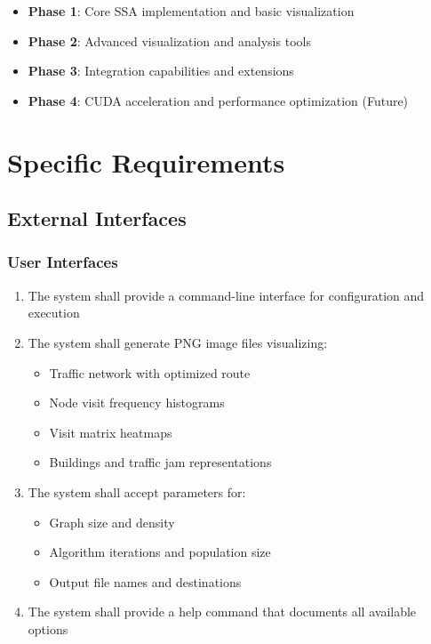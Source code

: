 \documentclass[conference]{IEEEtran}
\begin{document}
\begin{itemize}
    \item \textbf{Phase 1}: Core SSA implementation and basic visualization
    \item \textbf{Phase 2}: Advanced visualization and analysis tools
    \item \textbf{Phase 3}: Integration capabilities and extensions
    \item \textbf{Phase 4}: CUDA acceleration and performance optimization (Future)
\end{itemize}

\section{Specific Requirements}

\subsection{External Interfaces}

\subsubsection{User Interfaces}
\begin{enumerate}
    \item The system shall provide a command-line interface for configuration and execution
    \item The system shall generate PNG image files visualizing:
    \begin{itemize}
        \item Traffic network with optimized route
        \item Node visit frequency histograms
        \item Visit matrix heatmaps
        \item Buildings and traffic jam representations
    \end{itemize}
    \item The system shall accept parameters for:
    \begin{itemize}
        \item Graph size and density
        \item Algorithm iterations and population size
        \item Output file names and destinations
    \end{itemize}
    \item The system shall provide a help command that documents all available options
\end{enumerate}
\end{document}
